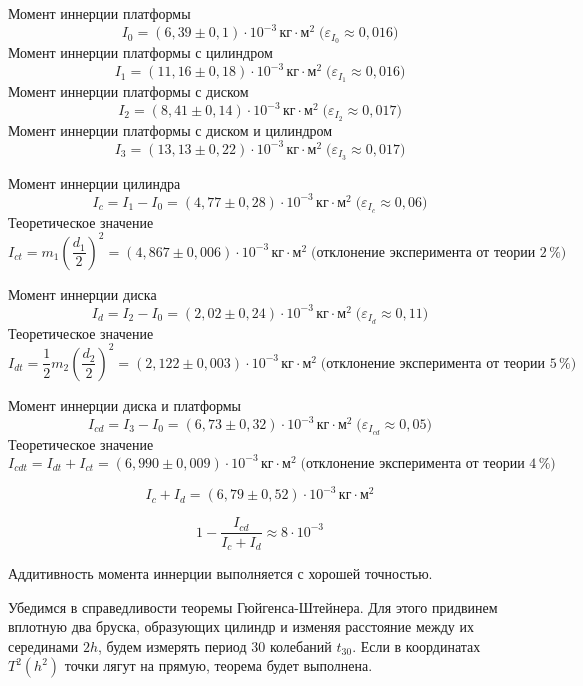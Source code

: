 Момент иннерции платформы
\[I_0 = \left(6{,}39\pm 0{,}1\right)\cdot 10^{-3}\,\text{кг}\cdot\text{м}^2
\;\text{(}\varepsilon_{I_0}\approx 0{,}016\text{)}\]
Момент иннерции платформы с цилиндром
\[I_1 = \left(11{,}16\pm 0{,}18\right)\cdot 10^{-3}\,\text{кг}\cdot\text{м}^2
\;\text{(}\varepsilon_{I_1}\approx 0{,}016\text{)}\]
Момент иннерции платформы с диском
\[I_2 = \left(8{,}41\pm 0{,}14\right)\cdot 10^{-3}\,\text{кг}\cdot\text{м}^2
\;\text{(}\varepsilon_{I_2}\approx 0{,}017\text{)}\]
Момент иннерции платформы с диском и цилиндром
\[I_3 = \left(13{,}13\pm 0{,}22\right)\cdot 10^{-3}\,\text{кг}\cdot\text{м}^2
\;\text{(}\varepsilon_{I_3}\approx 0{,}017\text{)}\]

Момент иннерции цилиндра
\[I_c = I_1-I_0 = \left(4{,}77\pm 0{,}28\right)\cdot 10^{-3}\,\text{кг}\cdot\text{м}^2
\;\text{(}\varepsilon_{I_c}\approx 0{,}06\text{)}\]
Теоретическое значение
\[I_{ct} = m_1\left(\frac{d_1}{2}\right)^2 = \left(4{,}867\pm 0{,}006\right)\cdot 10^{-3}\,\text{кг}\cdot\text{м}^2
\;\text{(отклонение эксперимента от теории $2\,\%$)}\]

Момент иннерции диска
\[I_d = I_2-I_0 = \left(2{,}02\pm 0{,}24\right)\cdot 10^{-3}\,\text{кг}\cdot\text{м}^2
\;\text{(}\varepsilon_{I_d}\approx 0{,}11\text{)}\]
Теоретическое значение
\[I_{dt} = \frac{1}{2}m_2\left(\frac{d_2}{2}\right)^2 = \left(2{,}122\pm 0{,}003\right)\cdot 10^{-3}\,\text{кг}\cdot\text{м}^2
\;\text{(отклонение эксперимента от теории $5\,\%$)}\]

Момент иннерции диска и платформы
\[I_{cd} = I_3-I_0 = \left(6{,}73\pm 0{,}32\right)\cdot 10^{-3}\,\text{кг}\cdot\text{м}^2
\;\text{(}\varepsilon_{I_{cd}}\approx 0{,}05\text{)}\]
Теоретическое значение
\[I_{cdt} = I_{dt} + I_{ct} = \left(6{,}990\pm 0{,}009\right)\cdot 10^{-3}\,\text{кг}\cdot\text{м}^2
\;\text{(отклонение эксперимента от теории $4\,\%$)}\]

\[I_c + I_d  = \left(6{,}79\pm 0{,}52\right)\cdot 10^{-3}\,\text{кг}\cdot\text{м}^2\]

\[1 - \frac{I_{cd}}{I_c+I_d}\approx 8\cdot 10^{-3}\]

Аддитивность момента иннерции выполняется с хорошей точностью.

Убедимся в справедливости теоремы Гюйгенса-Штейнера. Для этого придвинем вплотную два
бруска, образующих цилиндр и изменяя расстояние между их серединами $2h$, будем измерять
период 30 колебаний $t_30$. Если в координатах $T^2(h^2)$ точки лягут на прямую, теорема
будет выполнена.

